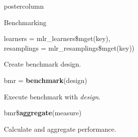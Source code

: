 \documentclass{beamer}
\begin{document}
\begin{frame}[fragile]{}
\begin{columns}
\begin{column}{.245\textwidth}
\begin{beamercolorbox}[center]{postercolumn}
\begin{minipage}{.98\textwidth}
{\begin{myblock}{Benchmarking}
\begin{codeboxmultiline}[width=21.95cm]
							      \hspace*{1ex}learners = mlr\_learners\$mget(key),\\
							      \hspace*{1ex}resamplings = mlr\_resamplings\$mget(key))
						      \end{codeboxmultiline}
						      Create benchmark design.
						      \\
						      \begin{codebox}
							      bmr = \textbf{benchmark}(design)
						      \end{codebox}
						      Execute benchmark with \textit{design}.
					      	\\
						      \begin{codebox}
							      bmr\$\textbf{aggregate}(measure)
						      \end{codebox}
						      Calculate and aggregate performance.
					        \end{myblock}\vfill
				            }
		          	\end{minipage}
		          \end{beamercolorbox}
	           \end{column}
            \end{columns}
          \end{frame}
        
\end{document}
